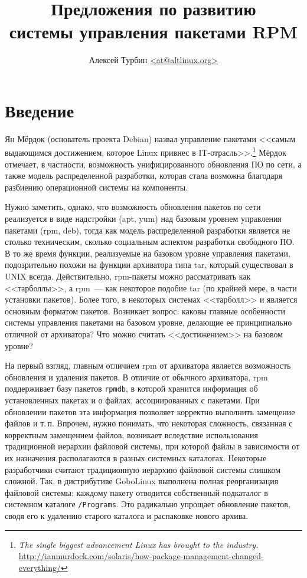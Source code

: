 \documentclass[russian,a4paper,12pt,titlepage]{article}
\begin{document}
\title{Предложения по развитию\\системы управления пакетами RPM}
\author{Алексей Турбин \url{<at@altlinux.org>}}
\maketitle
\tableofcontents
\pagebreak[4]

\section*{Введение}
Ян Мёрдок (основатель проекта Debian) назвал управление пакетами <<самым
выдающимся достижением, которое Linux привнес в IT-отрасль>>.\footnote{\textit{The
single biggest advancement Linux has brought to the industry.}
\url{http://ianmurdock.com/solaris/how-package-management-changed-everything/}}
Мёрдок отмечает, в частности, возможность унифицированного обновления ПО по сети,
а также модель распределенной разработки, которая стала возможна благодаря разбиению
операционной системы на компоненты.

Нужно заметить, однако, что возможность обновления пакетов по сети
реализуется в виде надстройки (apt, yum) над базовым уровнем управления пакетами
(rpm, deb), тогда как модель распределенной разработки является не столько техническим,
сколько социальным аспектом разработки свободного ПО.  В то же время функции, реализуемые
на базовом уровне управления пакетами, подозрительно похожи на функции архиватора типа tar,
который существовал в UNIX всегда.
Действительно, rpm-пакеты можно рассматривать как <<тарболлы>>, а rpm~--- как
некоторое подобие tar (по крайней мере, в части установки пакетов).  Более того,
в некоторых системах <<тарболл>> и является основным форматом пакетов.  Возникает
вопрос: каковы главные особенности системы управления пакетами на базовом уровне,
делающие ее принципиально отличной от архиватора?  Что можно считать
<<достижением>> на базовом уровне?

На первый взгляд, главным отличием rpm от архиватора является возможность обновления и удаления пакетов.
В отличие от обычного архиватора, rpm поддерживает базу пакетов \verb|rpmdb|, в которой хранится информация
об установленных пакетах и о файлах, ассоциированных с пакетами.  При обновлении пакетов эта информация
позволяет корректно выполнить замещение файлов и т.\,п.  Впрочем, нужно понимать, что некоторая сложность,
связанная с корректным замещением файлов, возникает вследствие использования традиционной иерархии файловой
системы, при которой файлы в зависимости от их назначения располагаются в разных системных каталогах.
Некоторые разработчики считают традиционную иерархию файловой системы слишком сложной.
Так, в дистрибутиве GoboLinux выполнена полная реорганизация файловой системы: каждому пакету отводится
собственный подкаталог в системном каталоге \verb|/Programs|.  Это радикально упрощает обновление пакетов,
сводя его к удалению старого каталога и распаковке нового архива.
\end{document}
